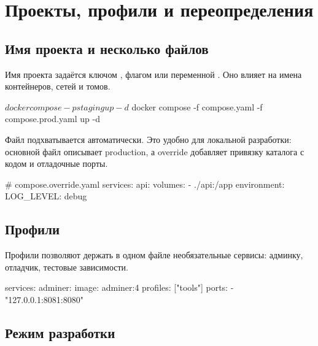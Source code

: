 \section{Проекты, профили и переопределения}

\subsection{Имя проекта и несколько файлов}

Имя проекта задаётся ключом , флагом  или
переменной . Оно влияет на имена
контейнеров, сетей и томов.

\begin{code}[language=bash]
$ docker compose -p staging up -d
$ docker compose -f compose.yaml -f compose.prod.yaml up -d
\end{code}

Файл  подхватывается автоматически. Это
удобно для локальной разработки: основной файл описывает production,
а override добавляет привязку каталога с кодом и отладочные порты.

\begin{code}[language=composeyaml]
# compose.override.yaml
services:
  api:
    volumes:
      - ./api:/app
    environment:
      LOG_LEVEL: debug
\end{code}

\subsection{Профили}

Профили позволяют держать в одном файле необязательные сервисы:
админку, отладчик, тестовые зависимости.

\begin{code}[language=composeyaml]
services:
  adminer:
    image: adminer:4
    profiles: ["tools"]
    ports:
      - "127.0.0.1:8081:8080"
\end{code}


\subsection{Режим разработки}

